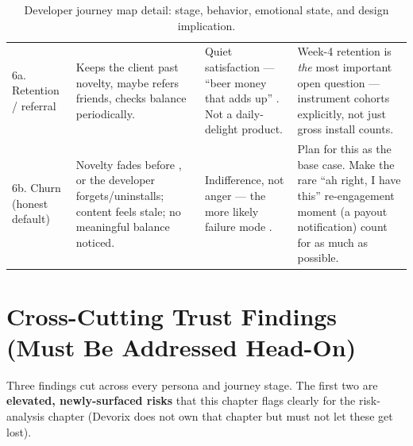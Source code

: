 \begin{table}[htbp]
\begin{tabular}{@{}p{2.1cm}p{4.6cm}p{2.6cm}p{4.6cm}@{}}
\addlinespace
6a. Retention / referral & Keeps the client past novelty, maybe refers friends, checks balance periodically. & Quiet satisfaction --- ``beer money that adds up'' \cite{mvpspec_2026}. Not a daily-delight product. & Week-4 retention is \emph{the} most important open question \cite{masterplan_2026} --- instrument cohorts explicitly, not just gross install counts. \\
\addlinespace
6b. Churn (honest default) & Novelty fades before \textrupee300, or the developer forgets/uninstalls; content feels stale; no meaningful balance noticed. & Indifference, not anger --- the more likely failure mode \cite{masterplan_2026}. & Plan for this as the base case. Make the rare ``ah right, I have this'' re-engagement moment (a payout notification) count for as much as possible. \\
\bottomrule
\end{tabular}
\caption{Developer journey map detail: stage, behavior, emotional state, and design implication.}
\label{tab:journey-detail}
\end{table}

\clearpage
\section{Cross-Cutting Trust Findings (Must Be Addressed Head-On)}
\label{sec:trust-findings}

Three findings cut across every persona and journey stage. The first two are \textbf{elevated, newly-surfaced risks} that this chapter flags clearly for the risk-analysis chapter (Devorix does not own that chapter but must not let these get lost).

